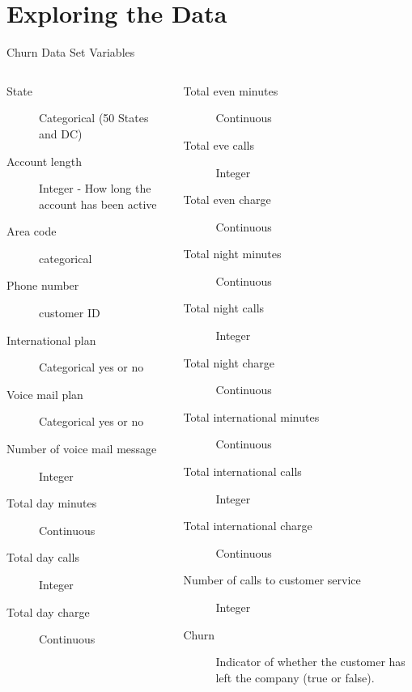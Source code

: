 \documentclass[handout]{beamer}
\begin{document}
\section{Exploring the Data}
\begin{frame}[t]{Churn Data Set Variables}
\begin{columns}
   {\scriptsize
   \begin{description}
     \item[State] Categorical (50 States and DC)
     \item[Account length] Integer - How long the account has been active
     \item[Area code] categorical
     \item[Phone number] customer ID
     \item[International plan] Categorical yes or no
     \item[Voice mail plan] Categorical yes or no
     \item[Number of voice mail message] Integer
     \item[Total day minutes] Continuous
     \item[Total day calls] Integer
     \item[Total day charge] Continuous
   \end{description}
   }
   {\scriptsize
   \begin{description}
     \item[Total even minutes] Continuous
     \item[Total eve calls] Integer
     \item[Total even charge] Continuous
     \item[Total night minutes] Continuous
     \item[Total night calls] Integer
     \item[Total night charge] Continuous
     \item[Total international minutes] Continuous
     \item[Total international calls] Integer
     \item[Total international charge] Continuous
     \item[Number of calls to customer service] Integer
     \item[Churn] Indicator of whether the customer has left the company (true or false).
  \end{description}
  }
\end{columns}
\end{frame}
\end{document}
